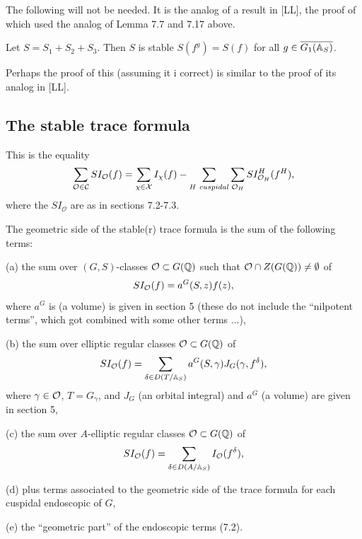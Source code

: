 The following will not be needed. It is the analog of a result in
[LL], the proof of which used the analog of Lemma 7.7
and 7.17 above.
\begin{conjecture}
Let $S=S_1+S_2+S_3$. Then $S$ is stable
$S(f^g)=S(f)$ for all $g\in \overline{G_1(\mathbb{A} _S)}$.
\end{conjecture}

Perhaps the proof of this (assuming it i correct)
is similar to the proof of its analog in [LL].

\subsection{The stable trace formula}

This is the equality 
\begin{equation}
\sum_{\mathcal{O}\in \mathcal{C}}SI_{\mathcal{O}}(f)
=\sum_{\chi \in {\mathcal{X}}}I_\chi (f)
-\sum_{H\ cuspidal}\sum_{{\cal O}_H}SI_{{\cal O}_H}^H(f^H),
\end{equation}
where the $SI_{\mathcal{O}}$ are as in sections 7.2-7.3.

The geometric side of the stable(r)
trace formula is the sum of the following terms:

(a) the sum over $(G,S)$-classes ${\cal{O}}\subset G(\mathbb{Q} )$
such that ${\cal{O}}\cap Z(G(\mathbb{Q} ))\not= \emptyset$ of
\begin{equation}
SI_{\cal{O}}(f)=
a^G(S,z)f(z),
\end{equation}
where $a^G$ is (a volume) is given in section 5 
(these do not include the ``nilpotent terms'', which
got combined with some other terms ...),

(b) the sum over elliptic regular classes 
${\cal{O}}\subset G(\mathbb{Q} )$
of
\begin{equation}
SI_{\cal{O}}(f)=
\sum_{\delta\in D(T/\mathbb{A} _S)}
a^G(S,\gamma)J_G(\gamma,f^\delta),
\end{equation}
where $\gamma\in {\cal{O}}$, $T=G_\gamma$, and
$J_G$ (an orbital integral) and $a^G$ (a volume)
are given in section 5,

(c)  the sum over $A$-elliptic regular classes
${\cal{O}}\subset G(\mathbb{Q} )$
of
\begin{equation}
SI_{\cal{O}}(f)=
\sum_{\delta\in D(A/\mathbb{A} _S)}
I_{\cal{O}}(f^\delta),
\end{equation}

(d) plus terms associated to the geometric side of the 
trace formula for each cuspidal endoscopic of $G$,

(e) the ``geometric part'' of the endoscopic terms (7.2).

